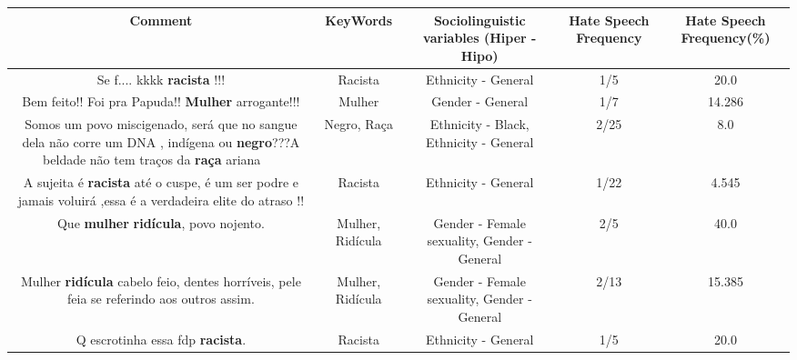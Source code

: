 \documentclass[11pt]{article}
\newlength\mylength
\begin{document}
\begin{center}
\setlength\mylength{\dimexpr\textwidth - 1\arrayrulewidth - 50\tabcolsep}
\begin{longtable}{|C{.65\mylength}|C{.30\mylength}|C{.12\mylength}|C{.12\mylength}|C{.12\mylength}|}
\hline
\textbf{Comment} & \textbf{KeyWords} & \textbf{Sociolinguistic variables (Hiper - Hipo)}  & \textbf{Hate Speech Frequency} & \textbf{Hate Speech Frequency(\%)} \\
\hline{}\small Se f.... kkkk \textbf{racista} !!!\normalsize   & Racista & Ethnicity - General & 1/5 & 20.0 \\  \hline
  \small Bem feito!! Foi pra Papuda!! \textbf{Mulher} arrogante!!!\normalsize   & Mulher & Gender - General & 1/7 & 14.286 \\  \hline
  \small Somos um povo miscigenado,  será  que no sangue dela não  corre um DNA , indígena  ou \textbf{negro}???A beldade não  tem traços  da \textbf{raça}  ariana 🤔🤔🤔🤔\normalsize   & Negro, Raça & Ethnicity - Black, Ethnicity - General & 2/25 & 8.0 \\  \hline
  \small A sujeita é \textbf{racista} até o cuspe, é um ser podre e jamais voluirá ,essa é a verdadeira elite do atraso !!\normalsize   & Racista & Ethnicity - General & 1/22 & 4.545 \\  \hline
  \small Que \textbf{mulher} \textbf{ridícula}, povo nojento.\normalsize   & Mulher, Ridícula & Gender - Female sexuality, Gender - General & 2/5 & 40.0 \\  \hline
  \small Mulher \textbf{ridícula} cabelo feio, dentes horríveis, pele feia se referindo aos outros assim.\normalsize   & Mulher, Ridícula & Gender - Female sexuality, Gender - General & 2/13 & 15.385 \\  \hline
  \small Q escrotinha essa fdp \textbf{racista}.\normalsize   & Racista & Ethnicity - General & 1/5 & 20.0 \\  \hline

\end{longtable}
\end{center}
\end{document}
